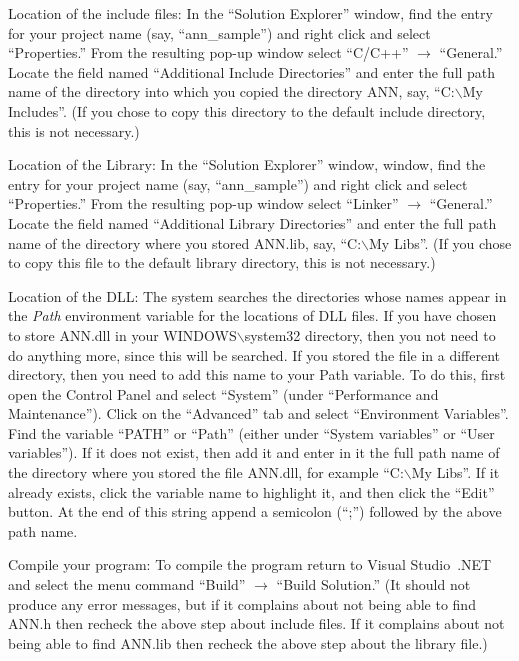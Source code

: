 \documentclass[11pt]{article}		%
\newenvironment{description*}%
  {\begin{description}%
    \setlength{\itemsep}{-0.5ex}%
    \setlength{\parsep}{0pt}}%
  {\end{description}}
\newcommand{\annsample}[0]{\textsf{ann\_sample}}
\newcommand{\BSL}{\hbox{$\backslash$}}
\begin{document}
\begin{description*}
\item[Location of the include files:] In the ``Solution Explorer''
	window, find the entry for your project name (say, ``{\annsample}'')
	and right click and select ``Properties.'' From the resulting pop-up
	window select ``C/C++'' $\rightarrow$ ``General.'' Locate the field
	named ``Additional Include Directories'' and enter the full path
	name of the directory into which you copied the directory
	\textsf{ANN}, say, ``\textsf{C:{\BSL}My Includes}''.  (If you chose
	to copy this directory to the default include directory, this is not
	necessary.)

\item[Location of the Library:] In the ``Solution Explorer'' window,
	window, find the entry for your project name (say, ``{\annsample}'')
	and right click and select ``Properties.'' From the resulting pop-up
	window select ``Linker'' $\rightarrow$ ``General.'' Locate the field
	named ``Additional Library Directories'' and enter the full path
	name of the directory where you stored \textsf{ANN.lib}, say,
	``\textsf{C:{\BSL}My Libs}''.  (If you chose to copy this file to
	the default library directory, this is not necessary.)

\item[Location of the DLL:] The system searches the directories whose
	names appear in the \emph{Path} environment variable for the
	locations of DLL files.  If you have chosen to store
	\textsf{ANN.dll} in your \textsf{WINDOWS{\BSL}system32} directory,
	then you not need to do anything more, since this will be searched.
	If you stored the file in a different directory, then you need to
	add this name to your Path variable.  To do this, first open the
	Control Panel and select ``System'' (under ``Performance and
	Maintenance'').  Click on the ``Advanced'' tab and select
	``Environment Variables''.  Find the variable ``PATH'' or ``Path''
	(either under ``System variables'' or ``User variables'').  If it
	does not exist, then add it and enter in it the full path name of
	the directory where you stored the file \textsf{ANN.dll}, for
	example ``\textsf{C:{\BSL}My Libs}''.  If it already exists, click
	the variable name to highlight it, and then click the ``Edit''
	button.  At the end of this string append a semicolon (``;'')
	followed by the above path name.

\item[Compile your program:] To compile the program return to Visual
	Studio~.NET and select the menu command ``Build'' $\rightarrow$
	``Build Solution.''  (It should not produce any error messages, but
	if it complains about not being able to find \textsf{ANN.h} then
	recheck the above step about include files. If it complains about
	not being able to find \textsf{ANN.lib} then recheck the above step
	about the library file.)
\end{description*}
\end{document}
